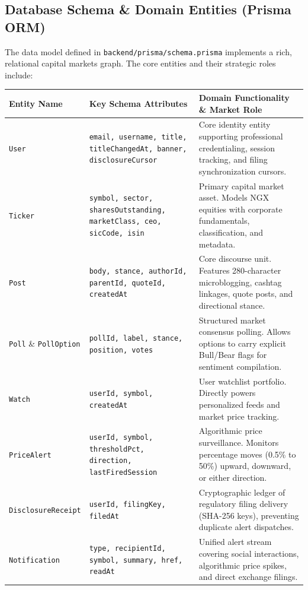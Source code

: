 \documentclass[11pt,a4paper]{article}
\begin{document}
\subsection{Database Schema \& Domain Entities (Prisma ORM)}

The data model defined in \texttt{backend/prisma/schema.prisma} implements a rich, relational capital markets graph. The core entities and their strategic roles include:

\begin{table}[h!]
\centering
\small
\begin{tabularx}{\textwidth}{l p{4.2cm} X}
\toprule
\textbf{Entity Name} & \textbf{Key Schema Attributes} & \textbf{Domain Functionality \& Market Role} \\
\midrule
\texttt{User} & \texttt{email, username, title, titleChangedAt, banner, disclosureCursor} & Core identity entity supporting professional credentialing, session tracking, and filing synchronization cursors. \\
\addlinespace
\texttt{Ticker} & \texttt{symbol, sector, sharesOutstanding, marketClass, ceo, sicCode, isin} & Primary capital market asset. Models NGX equities with corporate fundamentals, classification, and metadata. \\
\addlinespace
\texttt{Post} & \texttt{body, stance, authorId, parentId, quoteId, createdAt} & Core discourse unit. Features 280-character microblogging, cashtag linkages, quote posts, and directional stance. \\
\addlinespace
\texttt{Poll} \& \texttt{PollOption} & \texttt{pollId, label, stance, position, votes} & Structured market consensus polling. Allows options to carry explicit Bull/Bear flags for sentiment compilation. \\
\addlinespace
\texttt{Watch} & \texttt{userId, symbol, createdAt} & User watchlist portfolio. Directly powers personalized feeds and market price tracking. \\
\addlinespace
\texttt{PriceAlert} & \texttt{userId, symbol, thresholdPct, direction, lastFiredSession} & Algorithmic price surveillance. Monitors percentage moves (0.5\% to 50\%) upward, downward, or either direction. \\
\addlinespace
\texttt{DisclosureReceipt} & \texttt{userId, filingKey, filedAt} & Cryptographic ledger of regulatory filing delivery (SHA-256 keys), preventing duplicate alert dispatches. \\
\addlinespace
\texttt{Notification} & \texttt{type, recipientId, symbol, summary, href, readAt} & Unified alert stream covering social interactions, algorithmic price spikes, and direct exchange filings. \\

\end{tabularx}
\end{table}
\end{document}
